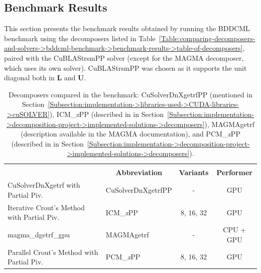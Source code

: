 \subsection{Benchmark Results}\label{Subsection:comparing-decomposers-and-solvers->bddcml-benchmark->benchmark-results}
This section presents the benchmark results obtained by running the BDDCML benchmark using the decomposers listed in Table~\ref{Table:comparing-decomposers-and-solvers->bddcml-benchmark->benchmark-results->table-of-decomposers}, paired with the CuBLAStrsmPP solver (except for the MAGMA decomposer, which uses its own solver).
CuBLAStrsmPP was chosen as it supports the unit diagonal both in $\mathbf{L}$ and $\mathbf{U}$.

\begin{table}[ht!]
	\centering
	\begin{tabular}{|ll|c|c|}
		\hline
		\rowcolor[HTML]{C0C0C0} 
		\multicolumn{2}{|c|}{\cellcolor[HTML]{C0C0C0}\textbf{Decomposer}} & \cellcolor[HTML]{C0C0C0} & \multicolumn{1}{c|}{\cellcolor[HTML]{C0C0C0}} \\
		\rowcolor[HTML]{EFEFEF} 
		\multicolumn{1}{|c|}{\cellcolor[HTML]{EFEFEF}\textbf{Name}} & \multicolumn{1}{c|}{\cellcolor[HTML]{EFEFEF}\textbf{Abbreviation}} & \multirow{-2}{*}{\cellcolor[HTML]{C0C0C0}\textbf{Variants}} & \multicolumn{1}{c|}{\multirow{-2}{*}{\cellcolor[HTML]{C0C0C0}\textbf{Performer}}} \\ \hline
		\multicolumn{1}{|l|}{CuSolverDnXgetrf with Partial Piv.}         & CuSolverDnXgetrfPP &     -     &    GPU    \\
		\multicolumn{1}{|l|}{Iterative Crout's Method with Partial Piv.} & ICM\_\textit{x}PP  & 8, 16, 32 &    GPU    \\
		\multicolumn{1}{|l|}{magma\_dgetrf\_gpu}                         & MAGMAgetrf         &     -     & CPU + GPU \\
		\multicolumn{1}{|l|}{Parallel Crout's Method with Partial Piv.}  & PCM\_\textit{x}PP  & 8, 16, 32 &    GPU    \\ \hline
	\end{tabular}
	\caption{Decomposers compared in the benchmark: CuSolverDnXgetrfPP (mentioned in Section~\ref{Subsection:implementation->libraries-used->CUDA-libraries->cuSOLVER}), ICM\_\textit{x}PP (described in  in Section~\ref{Subsection:implementation->decomposition-project->implemented-solutions->decomposers}), MAGMAgetrf (description available in the MAGMA documentation), and PCM\_\textit{x}PP (described in  in Section~\ref{Subsection:implementation->decomposition-project->implemented-solutions->decomposers}).
}
\end{table}
